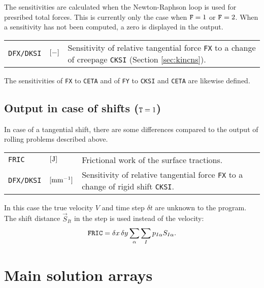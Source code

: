 \documentclass[12pt]{report}
\newenvironment{inputvars}{\vspace{0.4\baselineskip}%

\begin{tabular}{>{\raggedright}p{22mm}p{19mm}p{113mm}}}{
\end{tabular}

}
\newcommand{\inpvar}[3]{{\small\tt #1} & $#2$ & #3 \\[1ex]}
\begin{document}
The sensitivities are calculated when the Newton-Raphson loop is used for
presribed total forces. This is currently only the case when ${\tt F}=1$ or
${\tt F}=2$. When a sensitivity has not been computed, a zero is displayed
in the output.
\begin{inputvars}
\inpvar{DFX/DKSI}{\bunit{-}}{Sensitivity of relative tangential
        force {\tt FX} to a change of creepage {\tt CKSI} (Section
        \ref{sec:kincns}).}
\end{inputvars}
The sensitivities of {\tt FX} to {\tt CETA} and of {\tt FY} to {\tt CKSI}
and {\tt CETA} are likewise defined.

\subsection{\texorpdfstring{Output in case of shifts (${\tt T}=1$)}{}}

In case of a tangential shift, there are some differences compared to the
output of rolling problems described above.
\begin{inputvars}
\inpvar{FRIC}{\bunit{J}}{Frictional work of the surface tractions.}
\inpvar{DFX/DKSI}{\bunit{mm^{-1}}}{Sensitivity of relative tangential
        force {\tt FX} to a change of rigid shift {\tt CKSI}. }
\end{inputvars}
In this case the true velocity $V$ and time step $\delta t$ are unknown to
the program. The shift distance $\vec{S}_{It}$ in the step is used instead of
the velocity:
\begin{eqnarray}
  {\tt FRIC} = \delta x\,\delta y
                           \sum_\alpha \sum_I p_{I\alpha} S_{I\alpha} .
\end{eqnarray}

\section{Main solution arrays}
\label{sec:solut_arrays}
\end{document}
